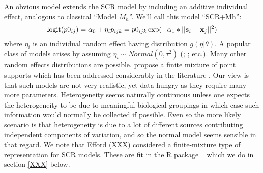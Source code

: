 An obvious model extends the SCR model by including an additive individual effect, analogous to classical ``Model $M_{h}$''. We'll call this model ``SCR+Mh'':
\[
\mbox{logit}(p0_{ij}) = \alpha_0 + \eta_{i}
p_{ijk} = p0_{ijk} \exp(- \alpha_1*||{\bf s}_{i}-{\bf x}_{j}||^2)
\]
where $\eta_{i}$ is an individual random effect having distribution
$g(\eta|\theta)$.  A popular class of models arises by assuming
$\eta_{i} \sim Normal(0,\tau^{2})$ (\citet{coull_agresti:1999};
\citet{dorazio_royle:2003}; etc.).  Many other random effects
distributions are possible. \citet{norris_pollock:1996} propose a
finite mixture of point supports which has been addressed considerably
in the literature \citep{pledger:2003, dorazio_royle:2003, link:2003}.  
Our view is that such models are not very realistic, yet data hungry 
as they require many more parameters. Heterogeneity seems naturally 
continuous unless one expects the heterogeneity to be due to meaningful 
biological groupings in which case such information would normally be 
collected if possible.  Even so the more likely scenario is that 
heterogeneity is due to a lot of different sources contributing 
independent components of variation, and so the normal model seems 
sensible in that regard. We note that Efford (XXX) considered a 
finite-mixture type of representation for SCR models. 
These are fit in the R package \secr~ which we do in section \ref{XXX} below.

